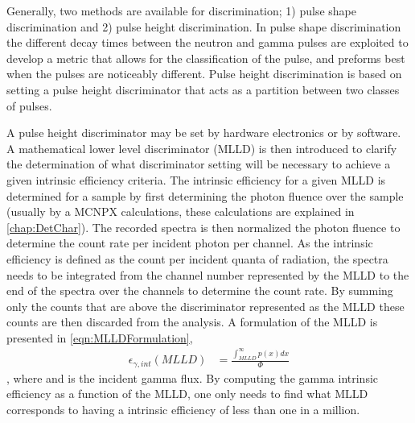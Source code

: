 Generally, two methods are available for discrimination; 1) pulse shape discrimination and 2) pulse height discrimination.
In pulse shape discrimination the different decay times between the neutron and gamma pulses are exploited to develop a metric that allows for the classification of the pulse, and preforms best when the pulses are noticeably different.
Pulse height discrimination is based on setting a pulse height discriminator that acts as a partition between two classes of pulses.

A pulse height discriminator may be set by hardware electronics or by software.
A mathematical lower level discriminator (MLLD) is then introduced to clarify the determination of what discriminator setting will be necessary to achieve a given intrinsic efficiency criteria.
The intrinsic efficiency for a given MLLD is determined for a sample by first determining the photon fluence over the sample (usually by a MCNPX calculations, these calculations are explained in \autoref{chap:DetChar}).
The recorded spectra is then normalized the photon fluence to determine the count rate per incident photon per channel.
As the intrinsic efficiency is defined as the count per incident quanta of radiation, the spectra needs to be integrated from the channel number represented by the MLLD to the end of the spectra over the channels to determine the count rate.
By summing only the counts that are above the discriminator represented as the MLLD these counts are then discarded from the analysis.
A formulation of the MLLD is presented in \eqref{eqn:MLLDFormulation},
\begin{align}
	\epsilon_{\gamma,int}\left(MLLD\right) &= \frac{\int_{MLLD}^{\infty}p(x)dx}{\Phi}
  \label{eqn:MLLDFormulation}
\end{align},
where  and  is the incident gamma flux.
By computing the gamma intrinsic efficiency as a function of the MLLD, one only needs to find what MLLD corresponds to having a intrinsic efficiency of less than one in a million.

